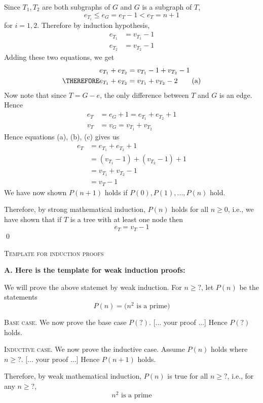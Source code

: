 Since $T_1, T_2$ are both subgraphs of $G$ and $G$ is a subgraph of $T$, 
\[
  e_{T_i} \leq e_G = e_T  - 1 < e_T  = n + 1
\]
for $i = 1, 2$.
Therefore by induction hypothesis,
\begin{align*}
    e_{T_1} &= v_{T_1} - 1 \\
    e_{T_2} &= v_{T_2} - 1
\end{align*}
Adding these two equations, we get
\begin{align*}
    e_{T_1} + e_{T_2} &= v_{T_1} - 1 + v_{T_2} - 1 \\
    \THEREFORE e_{T_1} + e_{T_2} &= v_{T_1} + v_{T_2} - 2 \tag{a}
\end{align*}
Now note that since $T = G - e$,
the only difference between $T$ and $G$ is an edge.
Hence
\begin{align*}
  e_T &= e_G + 1 = e_{T_1} + e_{T_2} + 1 \tag{b}  \\
  v_T &= v_G = v_{T_1} + v_{T_2} \tag{c}
\end{align*}
Hence equations (a), (b), (c) gives us
\begin{align*}
  e_T
  &= e_{T_1} + e_{T_2} + 1 \\
  &= \left( v_{T_1} - 1 \right) + \left( v_{T_2} - 1 \right) + 1 \\
  &= v_{T_1} + v_{T_2} - 1 \\
  &= v_T - 1
\end{align*}
We have now shown $P(n + 1)$ holds if $P(0), P(1), ..., P(n)$ hold.

Therefore,
by strong mathematical induction, $P(n)$ holds for all $n \geq 0$, i.e.,
we have shown that if $T$ is a tree with at least one node then
\[
  e_T = v_T - 1
\]
\qed


\newpage\textsc{Template for induction proofs}

\textbf{A. Here is the template for weak induction proofs:}

We will prove the above statemet by weak induction.
For $n \geq ?$, let $P(n)$ be the statements
\[
  P(n) = \biggl( n^2 \text{ is a prime} \biggr)
\]

\textsc{Base case}.
We now prove the base case $P(?)$. [... your proof ...]
Hence $P(?)$ holds.

\textsc{Inductive case}.
We now prove the inductive case.
Assume $P(n)$ holds where $n \geq ?$. 
[... your proof ...]
Hence $P(n + 1)$ holds.

Therefore, by weak mathematical induction,
$P(n)$ is true for all $n \geq ?$, i.e.,
for any $n \geq ?$,
\[
  n^2 \text{ is a prime}
\]
    


